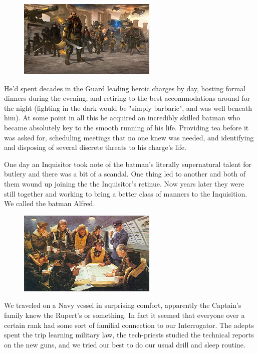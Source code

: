 \begin{figure}
	\begin{center}
		\includegraphics[width=\figwidth]{pics/4/4.png}
	\end{center}
\end{figure}
He'd spent decades in the Guard leading heroic charges by day, hosting formal dinners during the evening, and retiring to the best accommodations around for the night (fighting in the dark would be "simply barbaric", and was well beneath him). 
At some point in all this he acquired an incredibly skilled batman who became absolutely key to the smooth running of his life. 
Providing tea before it was asked for, scheduling meetings that no one knew was needed, and identifying and disposing of several discrete threats to his charge's life.

One day an Inquisitor took note of the batman's literally supernatural talent for butlery and there was a bit of a scandal. 
One thing led to another and both of them wound up joining the the Inquisitor's retinue. 
Now years later they were still together and working to bring a better class of manners to the Inquisition. We called the batman Alfred.

\begin{figure}
	\begin{center}
		\includegraphics[width=\figwidth]{pics/4/5.png}
	\end{center}
\end{figure}
We traveled on a Navy vessel in surprising comfort, apparently the Captain's family knew the Rupert's or something. 
In fact it seemed that everyone over a certain rank had some sort of familial connection to our Interrogator. 
The adepts spent the trip learning military law, the tech-priests studied the technical reports on the new guns, and we tried our best to do our usual drill and sleep routine. 


